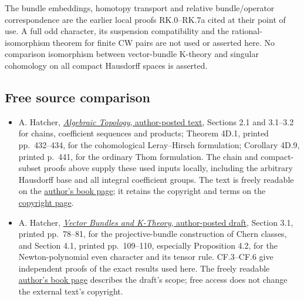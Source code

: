\documentclass[
  11pt,
]{article}
\providecommand{\tightlist}{%
  \setlength{\itemsep}{0pt}\setlength{\parskip}{0pt}}
\begin{document}
The bundle embeddings, homotopy transport and relative bundle/operator
correspondence are the earlier local proofs RK.0--RK.7a cited at their
point of use. A full odd character, its suspension compatibility and the
rational-isomorphism theorem for finite CW pairs are not used or
asserted here. No comparison isomorphism between vector-bundle K-theory
and singular cohomology on all compact Hausdorff spaces is asserted.

\subsection{Free source comparison}\label{free-source-comparison}

\begin{itemize}
\tightlist
\item
  A. Hatcher,
  \href{https://pi.math.cornell.edu/~hatcher/AT/AT.pdf}{\emph{Algebraic
  Topology}, author-posted text}, Sections 2.1 and 3.1--3.2 for chains,
  coefficient sequences and products; Theorem 4D.1, printed
  pp.~432--434, for the cohomological Leray--Hirsch formulation;
  Corollary 4D.9, printed p.~441, for the ordinary Thom formulation. The
  chain and compact-subset proofs above supply these used inputs
  locally, including the arbitrary Hausdorff base and all integral
  coefficient groups. The text is freely readable on the
  \href{https://pi.math.cornell.edu/~hatcher/AT/ATpage.html}{author's
  book page}; it retains the copyright and terms on the
  \href{https://pi.math.cornell.edu/~hatcher/AT/ATcopyright.html}{copyright
  page}.
\item
  A. Hatcher,
  \href{https://pi.math.cornell.edu/~hatcher/VBKT/VB.pdf}{\emph{Vector
  Bundles and K-Theory}, author-posted draft}, Section 3.1, printed
  pp.~78--81, for the projective-bundle construction of Chern classes,
  and Section 4.1, printed pp.~109--110, especially Proposition 4.2, for
  the Newton-polynomial even character and its tensor rule. CF.3--CF.6
  give independent proofs of the exact results used here. The freely
  readable
  \href{https://pi.math.cornell.edu/~hatcher/VBKT/VBpage.html}{author's
  book page} describes the draft's scope; free access does not change
  the external text's copyright.
\end{itemize}
\end{document}
